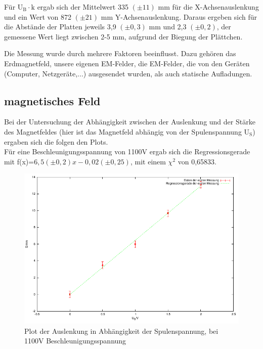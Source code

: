 \documentclass[12pt]{scrartcl}
\begin{document}
Für U$_\text{B} \cdot \text{k}$ ergab sich der Mittelwert 335 $(\pm 11)$ mm für die X-Achsenauslenkung und ein Wert von 872	$(\pm 21)$ mm Y-Achsenauslenkung.
Daraus ergeben sich für die Abstände der Platten jeweils 3,9 $(\pm 0,3)$ mm und 2,3	$(\pm 0,2)$, der gemessene Wert liegt zwischen 2-5 mm, aufgrund der Biegung der Plättchen.

Die Messung wurde durch mehrere Faktoren beeinflusst. Dazu gehören das Erdmagnetfeld, unsere eigenen EM-Felder, die EM-Felder, die von den Geräten (Computer, Netzgeräte,...) ausgesendet wurden, als auch statische Aufladungen.
\newpage
\subsection{magnetisches Feld}

Bei der Untersuchung der Abhängigkeit zwischen der Auslenkung und der Stärke des Magnetfeldes (hier ist das Magnetfeld abhängig von der Spulenspannung U$_\text{S}$) ergaben sich die folgen den Plots.\\
Für eine Beschleunigungsspannung von 1100V ergab sich die Regressionsgerade mit f(x)=$6,5 (\pm 0,2) x  - 0,02 (\pm 0,25)$, mit einem $\chi^2$ von 0,65833.

\begin{figure}[htbp] 
  \centering
    \includegraphics[scale = 1]{b_1.pdf}
  	\caption[Plot der Auslenkung in Abhängigkeit der Spulenspannung, bei 1100V Beschleunigungsspannung]{Plot der Auslenkung in Abhängigkeit der Spulenspannung, bei 1100V Beschleunigungsspannung}
  \label{fig:x_1}
\end{figure}

\newpage
\end{document}
